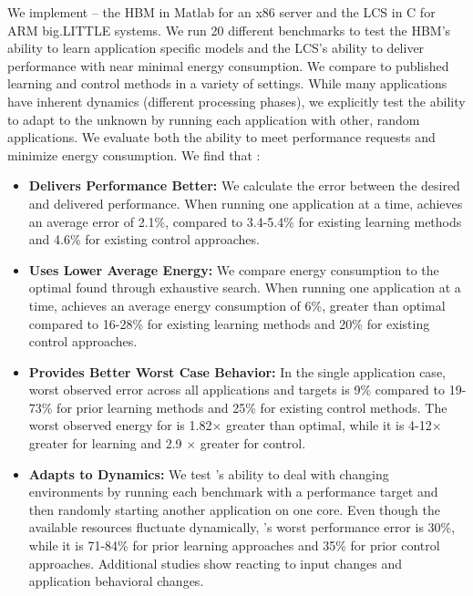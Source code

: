 We implement \SYSTEM{} -- the HBM in Matlab for an x86 server and the
LCS in C for ARM big.LITTLE systems.  We run 20 different benchmarks
to test the HBM's ability to learn application specific models and the
LCS's ability to deliver performance with near minimal energy
consumption.  We compare to published learning and control methods in
a variety of settings.  While many applications have inherent dynamics
(\ie different processing phases), we explicitly test the ability to
adapt to the unknown by running each application with other, random
applications.  We evaluate both the ability to meet performance
requests and minimize energy consumption.  We find that \SYSTEM{}:
\begin{itemize}
\item \textbf{Delivers Performance Better: } We calculate the error
  between the desired and delivered performance.  When running one
  application at a time, \SYSTEM{} achieves an average error of 2.1\%,
  compared to 3.4-5.4\% for existing learning methods and 4.6\% for
  existing control approaches.  
\item \textbf{Uses Lower Average Energy:} We compare energy
  consumption to the optimal found through exhaustive search.  When
  running one application at a time, \SYSTEM{} achieves an average
  energy consumption of 6\%, greater than optimal compared to 16-28\%
  for existing learning methods and 20\% for existing control
  approaches.
\item \textbf{Provides Better Worst Case Behavior:} In the single
  application case, \SYSTEM{} worst observed error across all
  applications and targets is 9\% compared to 19-73\% for prior
  learning methods and 25\% for existing control methods.  The worst
  observed energy for \SYSTEM{} is 1.82$\times$ greater than optimal,
  while it is 4-12$\times$ greater for learning and 2.9 $\times$
  greater for control.
\item \textbf{Adapts to Dynamics:} We test \SYSTEM{}'s ability to deal
  with changing environments by running each benchmark with a
  performance target and then randomly starting another application on
  one core.  Even though the available resources fluctuate
  dynamically, \SYSTEM{}'s worst performance error is 30\%, while it
  is 71-84\% for prior learning approaches and 35\% for prior control
  approaches.  Additional studies show \SYSTEM{} reacting to input
  changes and application behavioral changes.
\end{itemize}
